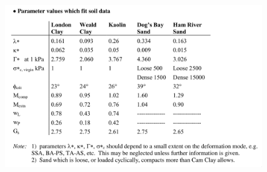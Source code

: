 \documentclass[a4paper,12pt]{article}
\begin{document}
\begin{figure}[!h]
	\includegraphics[width=\textwidth]{figs/soil-data-sheet.png}
\end{figure}
\end{document}

